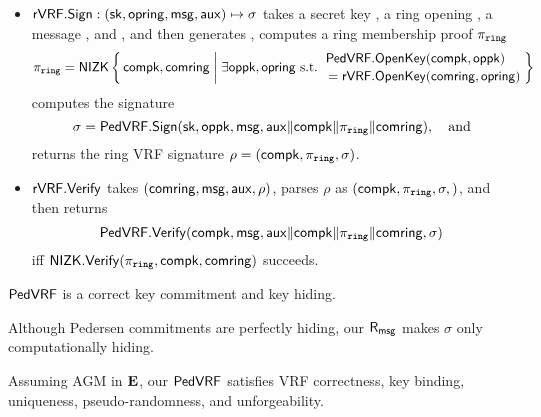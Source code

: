 \begin{itemize}
\item ${\mathsf{rVRF}}.{\mathsf{Sign}} : (\mathsf{sk},\mathsf{opring},\mathsf{msg},\mathsf{aux}) \mapsto \sigma$ takes
 a secret key \sk, a ring opening \openring, a message \msg, and \aux, and then %
 generates \openpk, computes a ring membership proof $\pi_{\mathtt{ring}}$
  $$ \piring = \NIZK \Setst{ \compk, \comring }{
  \exists \openpk,\openring \textrm{\ s.t.\ } 
  \genfrac{}{}{0pt}{}{\PedVRF.\OpenKey(\compk,\openpk) \quad}{\,\, = \rVRF.\OpenKey(\comring,\openring)}
  } $$
 computes the signature
  $$ \sigma = {\mathsf{PedVRF}}.{\mathsf{Sign}}(\mathsf{sk},\mathsf{oppk},\mathsf{msg},\mathsf{aux} \| \mathsf{compk} \| \pi_{\mathtt{ring}} \| \mathsf{comring}), \quad\textrm{and} $$ %
 returns the ring VRF signature $\rho = (\mathsf{compk},\pi_{\mathtt{ring}},\sigma)$.
\item ${\mathsf{rVRF}}.{\mathsf{Verify}}$ takes $(\mathsf{comring},\mathsf{msg},\mathsf{aux},\rho)$,
 parses $\rho$ as $(\mathsf{compk},\pi_{\mathtt{ring}},\sigma,)$,  and then returns
 $$ {\mathsf{PedVRF}}.{\mathsf{Verify}}(\mathsf{compk},\mathsf{msg},\mathsf{aux} \| \mathsf{compk} \| \pi_{\mathtt{ring}} \| \mathsf{comring},\sigma) $$
 iff ${\mathsf{NIZK}}.{\mathsf{Verify}}(\pi_{\mathtt{ring}},\mathsf{compk},\mathsf{comring})$ succeeds. 
\end{itemize}























\begin{lemma}\label{prop:pedersen_vrf_hiding}
${\mathsf{PedVRF}}$ is a correct key commitment and key hiding.
\end{lemma}

Although Pedersen commitments are perfectly hiding, our $\mathsf{R}_\mathsf{msg}$ makes $\sigma$ only computationally hiding.

\begin{proposition}\label{prop:pedersen_vrf}
Assuming AGM in ${\mathbf{E}}$, %
our ${\mathsf{PedVRF}}$ satisfies VRF correctness, key binding, uniqueness,
pseudo-randomness, and unforgeability. %
\end{proposition}

